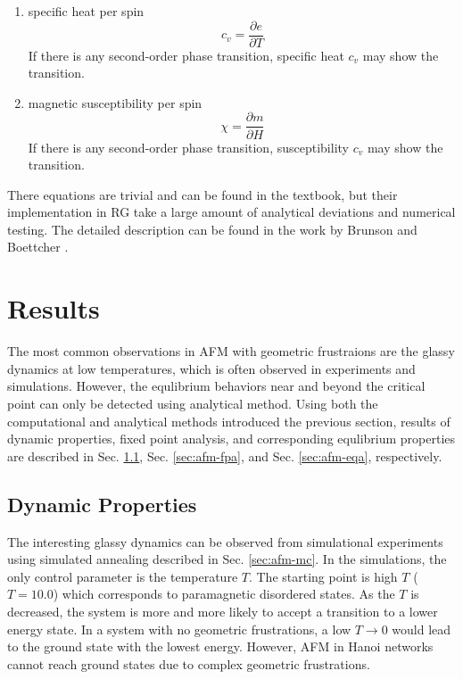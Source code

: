 \begin{enumerate}
\item specific heat per spin
\begin{equation}
c_v = \frac{\partial e} {\partial T}
\end{equation}
If there is any second-order phase transition, specific heat $c_v$ may show the transition.

\item magnetic susceptibility per spin
\begin{equation}
\chi = \frac{\partial m} {\partial H}
\end{equation}
If there is any second-order phase transition, susceptibility  $c_v$ may show the transition.

\end{enumerate}

There equations are trivial and can be found in the textbook, but their implementation in RG take a large amount of analytical deviations and numerical testing. The detailed description can be found in the work by Brunson and Boettcher \cite{brunson2014rg}.


\section{Results}
\label{sec:afm-results}
The most common observations in AFM with geometric frustraions are the glassy dynamics at low temperatures, which is often observed in experiments and simulations. However, the equlibrium behaviors near and beyond the critical point can only be detected using analytical method. Using both the computational and analytical methods introduced the previous section, results of dynamic properties, fixed point analysis, and corresponding equlibrium properties are described in Sec. \ref{sec:afm-dyn}, Sec. \ref{sec:afm-fpa}, and Sec. \ref{sec:afm-eqa}, respectively.

\subsection{Dynamic Properties}
\label{sec:afm-dyn}
The interesting glassy dynamics can be observed from simulational experiments using simulated annealing described in Sec. \ref{sec:afm-mc}. In the simulations, the only control parameter is the temperature $T$. The starting point is high $T$ ($T=10.0$) which corresponds to 
 paramagnetic disordered states. As the $T$ is decreased, the system is more and more likely to
 accept a transition to a lower energy state. In a system with no geometric frustrations, a low $T\rightarrow0$ would lead to the ground state with the lowest energy. However, AFM in Hanoi networks cannot reach ground states due to complex geometric frustrations. 

